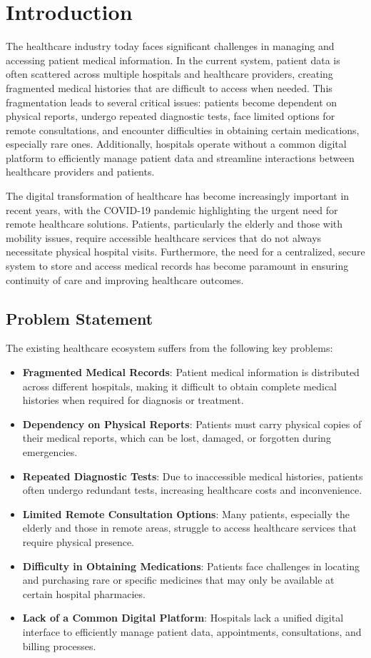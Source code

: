 \chapter{Introduction}
\label{ch:introduction}

The healthcare industry today faces significant challenges in managing and accessing patient medical information. In the current system, patient data is often scattered across multiple hospitals and healthcare providers, creating fragmented medical histories that are difficult to access when needed. This fragmentation leads to several critical issues: patients become dependent on physical reports, undergo repeated diagnostic tests, face limited options for remote consultations, and encounter difficulties in obtaining certain medications, especially rare ones. Additionally, hospitals operate without a common digital platform to efficiently manage patient data and streamline interactions between healthcare providers and patients.

\noindent
The digital transformation of healthcare has become increasingly important in recent years, with the COVID-19 pandemic highlighting the urgent need for remote healthcare solutions. Patients, particularly the elderly and those with mobility issues, require accessible healthcare services that do not always necessitate physical hospital visits. Furthermore, the need for a centralized, secure system to store and access medical records has become paramount in ensuring continuity of care and improving healthcare outcomes.

\section{Problem Statement}
The existing healthcare ecosystem suffers from the following key problems:
\begin{itemize}
    \item \textbf{Fragmented Medical Records}: Patient medical information is distributed across different hospitals, making it difficult to obtain complete medical histories when required for diagnosis or treatment.
    \item \textbf{Dependency on Physical Reports}: Patients must carry physical copies of their medical reports, which can be lost, damaged, or forgotten during emergencies.
    \item \textbf{Repeated Diagnostic Tests}: Due to inaccessible medical histories, patients often undergo redundant tests, increasing healthcare costs and inconvenience.
    \item \textbf{Limited Remote Consultation Options}: Many patients, especially the elderly and those in remote areas, struggle to access healthcare services that require physical presence.
    \item \textbf{Difficulty in Obtaining Medications}: Patients face challenges in locating and purchasing rare or specific medicines that may only be available at certain hospital pharmacies.
    \item \textbf{Lack of a Common Digital Platform}: Hospitals lack a unified digital interface to efficiently manage patient data, appointments, consultations, and billing processes.
\end{itemize}

